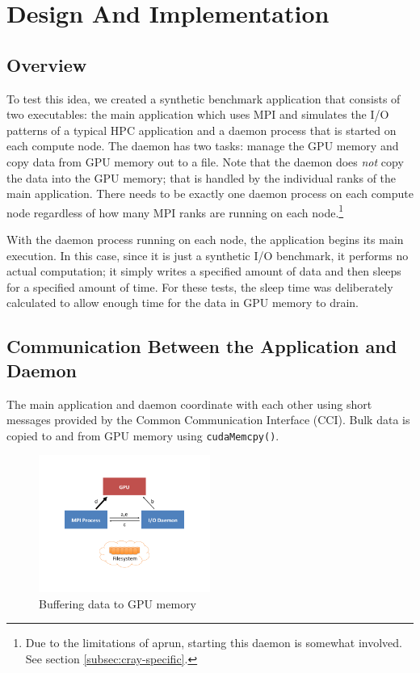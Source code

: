 \section{Design And Implementation}
\label{sec:design}

\subsection{Overview}
\label{subsec:overview}
To test this idea, we created a synthetic benchmark application that consists of two executables: the main application which uses MPI and simulates the I/O patterns of a typical HPC application and a daemon process that is started on each compute node.  The daemon has two tasks: manage the GPU memory and copy data from GPU memory out to a file.  Note that the daemon does \emph{not} copy the data into the GPU memory; that is handled by the individual ranks of the main application. There needs to be exactly one daemon process on each compute node regardless of how many MPI ranks are running on each node.\footnote{Due to the limitations of aprun, starting this daemon is somewhat involved.  See section \ref{subsec:cray-specific}.}

With the daemon process running on each node, the application begins its main execution.  In this case, since it is just a synthetic 
I/O benchmark, it performs no actual computation; it simply writes a specified amount of data and then sleeps for a specified amount of time.  For these tests, the sleep time was deliberately calculated to allow enough time for the data in GPU memory to drain.
\subsection{Communication Between the Application and Daemon}
\label{subsec:comm}

The main application and daemon coordinate with each other using short messages provided by the Common Communication Interface (CCI).\cite{atchley11:cci} Bulk data is copied to and from GPU memory using \texttt{cudaMemcpy()}.

\begin{figure}
\includegraphics[trim = .75in .75in .75in .75in, clip, width=0.5\textwidth]{figures/Data_Movement/Slide20}%
\caption{Buffering data to GPU memory}
\label{fig:buffer_write}
\end{figure}

